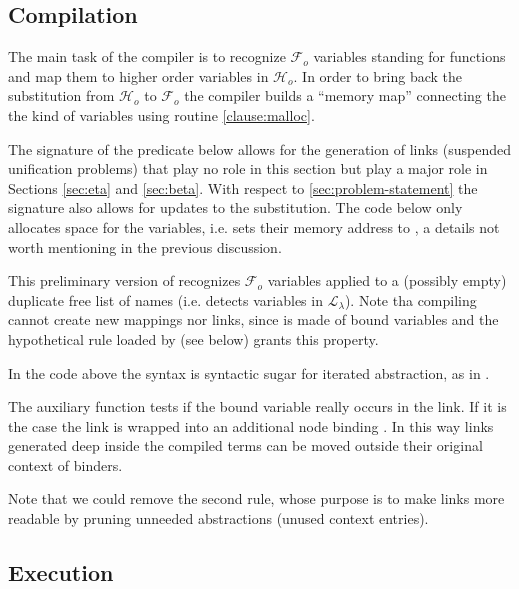 \documentclass[sigconf,natbib=false,review]{acmart}
\newcommand{\llambda}{\ensuremath{\mathcal{L}_\lambda}\xspace}
\newcommand{\Fo}{\ensuremath{\mathcal{F}_{\!o}\xspace}} %
\newcommand{\Ho}{\ensuremath{\mathcal{H}_o}\xspace}
\begin{document}
\subsection{Compilation}

The main task of the compiler is to recognize \Fo{} variables standing
for functions and map them to higher order variables in \Ho.
In order to bring back the substitution from \Ho{} to \Fo{} the compiler
builds a ``memory map'' connecting the the kind of variables using routine
\ref{clause:malloc}.

The signature of the  predicate below allows for the generation of
links (suspended unification problems) that play no role in this section
but play a major role in Sections \ref{sec:eta} and \ref{sec:beta}.
With respect to \ref{sec:problem-statement} the signature also allows
for updates to the substitution.  The code below only allocates space
for the variables, i.e. sets their memory address to ,
a details not worth mentioning in the previous discussion.



\noindent
This preliminary version of  recognizes \Fo{} variables
applied to a (possibly empty) duplicate free list of names (i.e.
 detects variables in \llambda).
Note tha compiling  cannot create new mappings nor links, since 
is made of bound variables and the hypothetical rule loaded by 
(see below) grants this property.



\noindent
In the code above the syntax  is syntactic sugar for
iterated  abstraction, as in .

The auxiliary function  tests if the bound variable
 really occurs in the link. If it is the case the link is wrapped into
an additional  node binding . In this way links generated
deep inside the compiled terms can be moved outside their original context
of binders.



\noindent
Note that we could remove the second rule, whose purpose is to make
links more readable by pruning unneeded abstractions (unused context entries).

\subsection{Execution}
\end{document}
